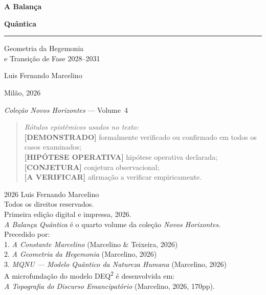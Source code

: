 \documentclass[12pt, twoside]{book}
\theoremstyle{plain}
\theoremstyle{definition}
\theoremstyle{remark}
\newcommand{\Proved}{\textnormal{\textbf{[DEMONSTRADO]}}}
\newcommand{\Hypoth}{\textnormal{\textbf{[HIP\'{O}TESE OPERATIVA]}}}
\newcommand{\Conj}{\textnormal{\textbf{[CONJETURA]}}}
\newcommand{\ToVerify}{\textnormal{\textbf{[A VERIFICAR]}}}
\begin{document}
\begin{titlepage}
  \centering\vspace*{1.5cm}
  {\Huge\bfseries A Balan\c{c}a\par}
  \vspace{0.2cm}
  {\Huge\bfseries Qu\^{a}ntica\par}
  \vspace{0.8cm}
  \rule{0.8\linewidth}{0.5pt}
  \vspace{0.6cm}

  {\large Geometria da Hegemonia\\[0.3cm]
   e Transi\c{c}\~{a}o de Fase 2028--2031\par}
  \vspace{2cm}
  {\large Luis Fernando Marcelino\par}
  \vspace{0.5cm}
  {\normalsize Mil\~{a}o, 2026\par}
  \vfill
  {\small\textit{Cole\c{c}\~{a}o Novos Horizontes} --- Volume~4\par}
  \vspace{0.5cm}
  \begin{small}\begin{quote}
    \textit{R\'{o}tulos epist\^{e}micos usados no texto:}\\[2pt]
    \Proved{} formalmente verificado ou confirmado em todos os casos examinados;\\
    \Hypoth{} hip\'{o}tese operativa declarada;\\
    \Conj{} conjetura observacional;\\
    \ToVerify{} afirma\c{c}\~{a}o a verificar empiricamente.
  \end{quote}\end{small}
\end{titlepage}

\thispagestyle{empty}
\vspace*{\fill}
\begin{small}
\noindent \textcopyright{} 2026 Luis Fernando Marcelino\\[4pt]
Todos os direitos reservados.\\[4pt]
Primeira edi\c{c}\~{a}o digital e impressa, 2026.\\[4pt]
\textit{A Balan\c{c}a Qu\^{a}ntica} \'{e} o quarto volume da cole\c{c}\~{a}o \textit{Novos Horizontes}.\\[4pt]
Precedido por:\\
1. \textit{A Constante Marcelino} (Marcelino \& Teixeira, 2026)\\
2. \textit{A Geometria da Hegemonia} (Marcelino, 2026)\\
3. \textit{MQNU --- Modelo Qu\^{a}ntico da Natureza Humana} (Marcelino, 2026)\\[4pt]
A microfunda\c{c}\~{a}o do modelo DEQ\textsuperscript{2} \'{e} desenvolvida em:\\
\textit{A Topografia do Discurso Emancipat\'{o}rio} (Marcelino, 2026, 170pp).
\end{small}
\vspace*{\fill}
\clearpage
\end{document}
